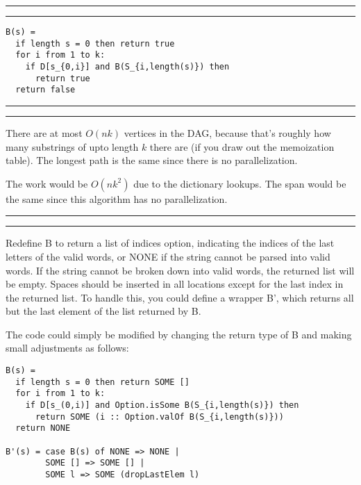 \documentclass[11pt,letterpaper]{article}
\newcommand{\question}[2] {\vspace{.25in} \hrule\vspace{0.5em}
\noindent{\bf #1: #2} \vspace{0.5em}
\hrule \vspace{.10in}}
\begin{document}
\question{10}{Task 3.7}
\begin{verbatim}
B(s) =
  if length s = 0 then return true
  for i from 1 to k:
    if D[s_{0,i}] and B(S_{i,length(s)}) then
      return true
  return false
\end{verbatim}

\question{11}{Task 3.8}
There are at most $O(nk)$ vertices in the DAG, because that's roughly how
many substrings of upto length $k$ there are (if you draw out the memoization table).
The longest path is the same since there is no parallelization.

The work would be $O(nk^2)$ due to the dictionary lookups. The span would be the same since this
algorithm has no parallelization.

\question{12}{Task 3.9}
Redefine B to return a list of indices option, indicating
the indices of the last letters of the valid words, or NONE if the
string cannot be parsed into valid words.
If the string cannot be broken down into valid words,
the returned list will be empty. Spaces should be inserted
in all locations except for the last index in the returned list.
To handle this, you could define a wrapper B', which returns all
but the last element of the list returned by B.

The code could simply be modified by changing the
return type of B and making small adjustments as follows:
\begin{verbatim}
B(s) =
  if length s = 0 then return SOME []
  for i from 1 to k:
    if D[s_(0,i)] and Option.isSome B(S_{i,length(s)}) then
      return SOME (i :: Option.valOf B(S_{i,length(s)}))
  return NONE

B'(s) = case B(s) of NONE => NONE |
        SOME [] => SOME [] |
        SOME l => SOME (dropLastElem l)
\end{verbatim}
\end{document}
